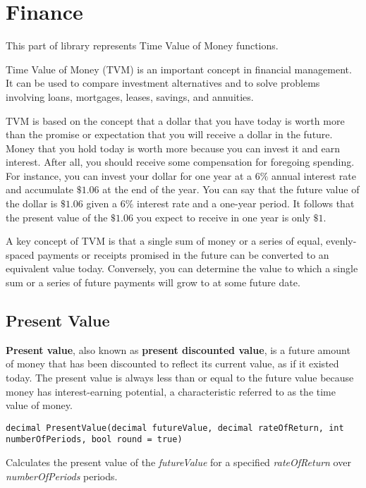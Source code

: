 
\chapter{Finance}

This part of library represents Time Value of Money functions.

Time Value of Money (TVM) is an important concept in financial management. It can be used to compare investment alternatives and to solve problems involving loans, mortgages, leases, savings, and annuities.

TVM is based on the concept that a dollar that you have today is worth more than the promise or expectation that you will receive a dollar in the future. Money that you hold today is worth more because you can invest it and earn interest. After all, you should receive some compensation for foregoing spending. For instance, you can invest your dollar for one year at a $6\%$ annual interest rate and accumulate $\$1.06$ at the end of the year.  You can say that the future value of the dollar is $\$1.06$ given a $6\%$ interest rate and a one-year period. It follows that the present value of the $\$1.06$ you expect to receive in one year is only $\$1$.

A key concept of TVM is that a single sum of money or a series of equal, evenly-spaced payments or receipts promised in the future can be converted to an equivalent value today.  Conversely, you can determine the value to which a single sum or a series of future payments will grow to at some future date.

\section{Present Value}
\textbf{Present value}, also known as \textbf{present discounted value}, is a future amount of money that has been discounted to reflect its current value, as if it existed today. The present value is always less than or equal to the future value because money has interest-earning potential, a characteristic referred to as the time value of money.
\begin{lstlisting}
decimal PresentValue(decimal futureValue, decimal rateOfReturn, int numberOfPeriods, bool round = true)
\end{lstlisting}
Calculates the present value of the \textit{futureValue} for a specified \textit{rateOfReturn} over \textit{numberOfPeriods} periods. 

